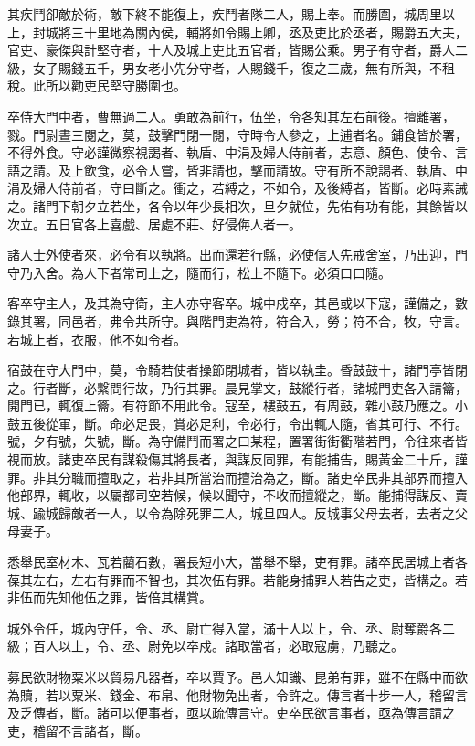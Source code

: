 \begin{pinyinscope}
其疾鬥卻敵於術，敵下終不能復上，疾鬥者隊二人，賜上奉。而勝圍，城周里以上，封城將三十里地為關內侯，輔將如令賜上卿，丞及吏比於丞者，賜爵五大夫，官吏、豪傑與計堅守者，十人及城上吏比五官者，皆賜公乘。男子有守者，爵人二級，女子賜錢五千，男女老小先分守者，人賜錢千，復之三歲，無有所與，不租稅。此所以勸吏民堅守勝圍也。

卒侍大門中者，曹無過二人。勇敢為前行，伍坐，令各知其左右前後。擅離署，戮。門尉晝三閱之，莫，鼓擊門閉一閱，守時令人參之，上逋者名。鋪食皆於署，不得外食。守必謹微察視謁者、執盾、中涓及婦人侍前者，志意、顏色、使令、言語之請。及上飲食，必令人嘗，皆非請也，擊而請故。守有所不說謁者、執盾、中涓及婦人侍前者，守曰斷之。衝之，若縛之，不如令，及後縛者，皆斷。必時素誡之。諸門下朝夕立若坐，各令以年少長相次，旦夕就位，先佑有功有能，其餘皆以次立。五日官各上喜戲、居處不莊、好侵侮人者一。

諸人士外使者來，必令有以執將。出而還若行縣，必使信人先戒舍室，乃出迎，門守乃入舍。為人下者常司上之，隨而行，松上不隨下。必須口口隨。

客卒守主人，及其為守衛，主人亦守客卒。城中戍卒，其邑或以下寇，謹備之，數錄其署，同邑者，弗令共所守。與階門吏為符，符合入，勞；符不合，牧，守言。若城上者，衣服，他不如令者。

宿鼓在守大門中，莫，令騎若使者操節閉城者，皆以執圭。昏鼓鼓十，諸門亭皆閉之。行者斷，必繫問行故，乃行其罪。晨見掌文，鼓縱行者，諸城門吏各入請籥，開門已，輒復上籥。有符節不用此令。寇至，樓鼓五，有周鼓，雜小鼓乃應之。小鼓五後從軍，斷。命必足畏，賞必足利，令必行，令出輒人隨，省其可行、不行。號，夕有號，失號，斷。為守備鬥而署之曰某程，置署街街衢階若門，令往來者皆視而放。諸吏卒民有謀殺傷其將長者，與謀反同罪，有能捕告，賜黃金二十斤，謹罪。非其分職而擅取之，若非其所當治而擅治為之，斷。諸吏卒民非其部界而擅入他部界，輒收，以屬都司空若候，候以聞守，不收而擅縱之，斷。能捕得謀反、賣城、踰城歸敵者一人，以令為除死罪二人，城旦四人。反城事父母去者，去者之父母妻子。

悉舉民室材木、瓦若藺石數，署長短小大，當舉不舉，吏有罪。諸卒民居城上者各葆其左右，左右有罪而不智也，其次伍有罪。若能身捕罪人若告之吏，皆構之。若非伍而先知他伍之罪，皆倍其構賞。

城外令任，城內守任，令、丞、尉亡得入當，滿十人以上，令、丞、尉奪爵各二級；百人以上，令、丞、尉免以卒戍。諸取當者，必取寇虜，乃聽之。

募民欲財物粟米以貿易凡器者，卒以賈予。邑人知識、昆弟有罪，雖不在縣中而欲為贖，若以粟米、錢金、布帛、他財物免出者，令許之。傳言者十步一人，稽留言及乏傳者，斷。諸可以便事者，亟以疏傳言守。吏卒民欲言事者，亟為傳言請之吏，稽留不言諸者，斷。


\end{pinyinscope}
